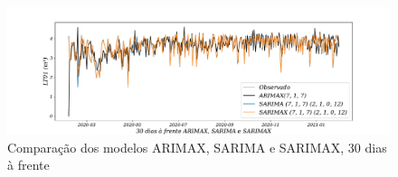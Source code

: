 \begin{figure}[!htpb]
	\centering
	\caption{Comparação dos modelos ARIMAX, SARIMA e SARIMAX, 30 dias à frente }
	\label{fig:60-ARIMAX-SARIMA-SARIMAX24}
	\includegraphics[width=1\linewidth]{Apendices/Figuras/modelagem-24h/30-ARIMAX-SARIMA-SARIMAX}
	
\end{figure}